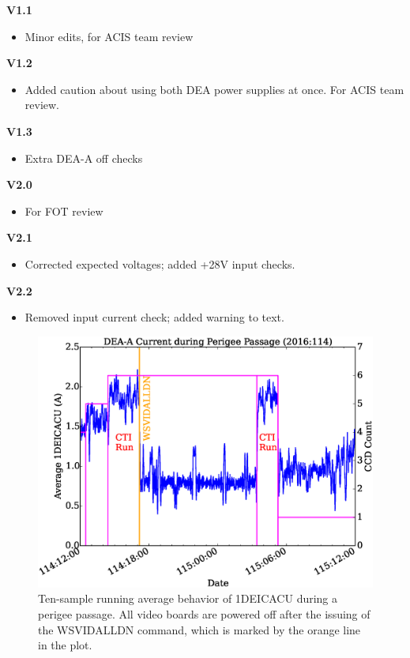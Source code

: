 \documentclass[11pt]{article}
\begin{document}
{\bf V1.1}
\begin{itemize}
\item Minor edits, for ACIS team review
\end{itemize}

{\bf V1.2}
\begin{itemize}
\item Added caution about using both DEA power supplies at once. 
For ACIS team review.
\end{itemize}

{\bf V1.3}
\begin{itemize}
\item Extra DEA-A off checks
\end{itemize}

{\bf V2.0}
\begin{itemize}
\item For FOT review
\end{itemize}

{\bf V2.1}
\begin{itemize}
\item Corrected expected voltages; added +28V input checks.
\end{itemize}

{\bf V2.2}
\begin{itemize}
\item Removed input current check; added warning to text.
\end{itemize}

\begin{landscape}
\begin{figure}
\begin{center}
\includegraphics[width=1.2\textwidth]{deaa_on_fig1.eps}
\caption{Ten-sample running average behavior of 1DEICACU during a perigee passage.
All video boards are powered off after the issuing of the WSVIDALLDN command,
which is marked by the orange line in the plot.}
\end{center}
\end{figure}
\end{landscape}
\end{document}
